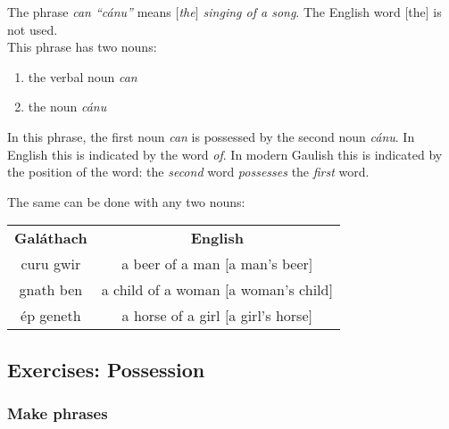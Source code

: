 The phrase \textit{can ``c\'{a}nu''} means \textit{$[$the$]$ singing of a song}. The English word $[$the$]$ is not used.\\

This phrase has two nouns:
\begin{enumerate}
 \item{the verbal noun \textit{can}}
 \item{the noun \textit{c\'{a}nu}}
\end{enumerate}
In this phrase, the first noun \textit{can} is possessed by the second noun \textit{c\'{a}nu}. In English this is indicated by the word \textit{of}. In modern Gaulish this is indicated by the position of the word: the \textit{second} word \textit{possesses} the \textit{first} word.

The same can be done with any two nouns:
\begin{table}[H]
\centering
\begin{tabular}{cc}
  \toprule
  \textbf{Gal\'{a}thach} & \textbf{English}\\
  \cmidrule(lr){1-1}\cmidrule(lr){2-2}
  curu gwir & a beer of a man $[$a man's beer$]$\\
  gnath ben & a child of a woman $[$a woman's child$]$\\
  \'{e}p geneth & a horse of a girl $[$a girl's horse$]$\\
  \bottomrule
\end{tabular}
\label{examples_possession_word_position}
\end{table}

\newpage
\subsection{Exercises: Possession}

\subsubsection{Make phrases}


